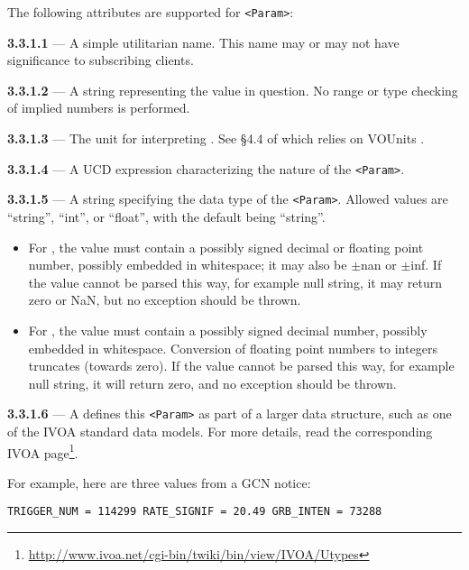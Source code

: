 \documentclass[11pt,a4paper]{ivoa}
\begin{document}
The following attributes are supported for \verb|<Param>|:

\noindent \textbf{3.3.1.1} \label{sec:3.3.1.1} --- A simple utilitarian
name. This name may or may not have significance to subscribing clients.

\noindent \textbf{3.3.1.2} \label{sec:3.3.1.2} --- A string representing
the value in question. No range or type checking of implied numbers is
performed.

\noindent \textbf{3.3.1.3} \label{sec:3.3.1.3} --- The unit for
interpreting . See \S4.4 of \citep{2019ivoa.spec.1021O}
which relies on VOUnits \citep{2023ivoa.spec.1215G}.

\noindent \textbf{3.3.1.4} \label{sec:3.3.1.4} --- A UCD
\citep{2018ivoa.spec.0527P}
expression characterizing the nature of the \verb|<Param>|.

\noindent \textbf{3.3.1.5} \label{sec:3.3.1.5} --- A string specifying
the data type of the \verb|<Param>|. Allowed values are ``string'', ``int'', or
``float'', with the default being ``string''.
\begin{itemize}
\item For , the value must contain a possibly signed decimal
or floating point number, possibly embedded in whitespace; it may also be
$\pm$nan or $\pm$inf. If the value cannot be parsed this way, for example null
string, it may return zero or NaN, but no exception should be thrown.
\item For , the value must contain a possibly signed decimal
number, possibly embedded in whitespace. Conversion of floating point numbers to
integers truncates (towards zero). If the value cannot be parsed this way, for
example null string, it will return zero, and no exception should be thrown.
\end{itemize}

\noindent \textbf{3.3.1.6} \label{sec:3.3.1.6} --- A  defines
this \verb|<Param>| as part of a larger data structure, such as one of the IVOA
standard data models. For more details, read the corresponding IVOA
page\footnote{\url{http://www.ivoa.net/cgi-bin/twiki/bin/view/IVOA/Utypes}}.

For example, here are three values from a GCN \citep{bib04} notice:
\begin{lstlisting}
TRIGGER_NUM = 114299 RATE_SIGNIF = 20.49 GRB_INTEN = 73288
\end{lstlisting}
\end{document}
